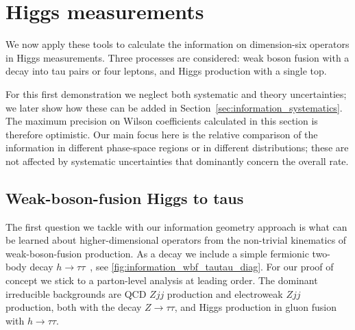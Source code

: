 \section{Higgs measurements}
\label{sec:information_application_even}

We now apply these tools to calculate the information on dimension-six
operators in Higgs measurements. Three processes are considered: weak
boson fusion with a decay into tau pairs or four leptons, and Higgs
production with a single top.

For this first demonstration we neglect both systematic and theory
uncertainties; we later show how these can be added in
Section~\ref{sec:information_systematics}. The maximum precision on
Wilson coefficients calculated in this section is therefore
optimistic. Our main focus here is the relative comparison of the
information in different phase-space regions or in different
distributions; these are not affected by systematic uncertainties that
dominantly concern the overall rate.



\subsection{Weak-boson-fusion Higgs to taus}
\label{sec:information_wbf_tautau}

The first question we tackle with our information geometry approach is
what can be learned about higher-dimensional operators from the
non-trivial kinematics of weak-boson-fusion production. As a decay we
include a simple fermionic two-body decay
$h \to \tau \tau$~\cite{Rainwater:1998kj, Plehn:1999xi}, see
\autoref{fig:information_wbf_tautau_diag}. For our proof of concept we
stick to a parton-level analysis at leading order.  The dominant irreducible
backgrounds are QCD $Zjj$ production and electroweak $Zjj$ production,
both with the decay $Z \to \tau \tau$, and Higgs production in gluon
fusion with $h \to \tau \tau$.

